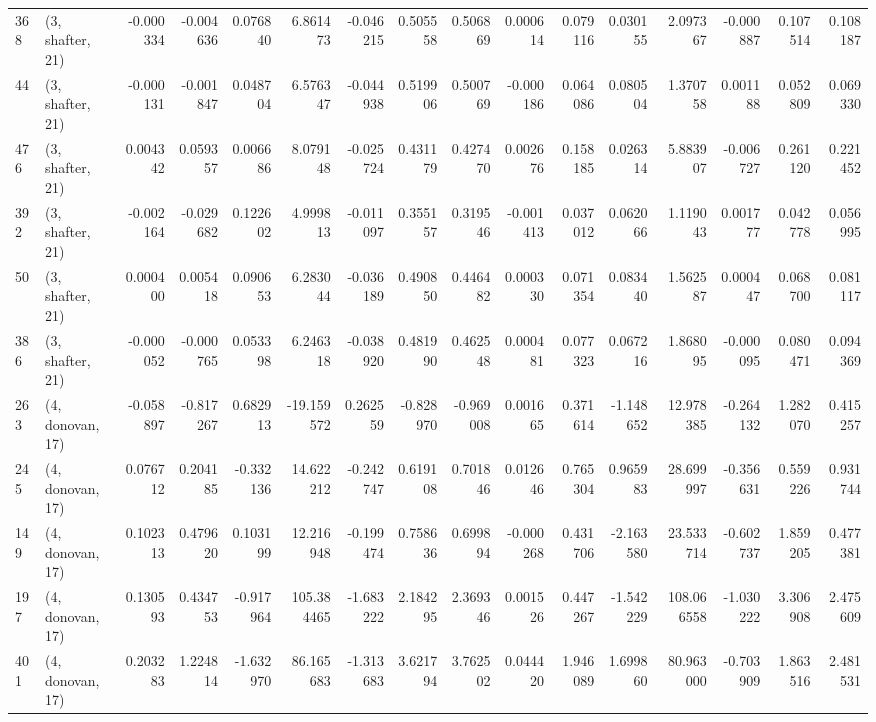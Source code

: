 \begin{tabular}{llrrrrrrrrrrrrrr}
368 &  (3, shafter, 21) &  -0.000334 & -0.004636 &  0.076840 &    6.861473 & -0.046215 &   0.505558 &  0.506869 &  0.000614 &  0.079116 &  0.030155 &    2.097367 & -0.000887 &  0.107514 &  0.108187 \\
44  &  (3, shafter, 21) &  -0.000131 & -0.001847 &  0.048704 &    6.576347 & -0.044938 &   0.519906 &  0.500769 & -0.000186 &  0.064086 &  0.080504 &    1.370758 &  0.001188 &  0.052809 &  0.069330 \\
476 &  (3, shafter, 21) &   0.004342 &  0.059357 &  0.006686 &    8.079148 & -0.025724 &   0.431179 &  0.427470 &  0.002676 &  0.158185 &  0.026314 &    5.883907 & -0.006727 &  0.261120 &  0.221452 \\
392 &  (3, shafter, 21) &  -0.002164 & -0.029682 &  0.122602 &    4.999813 & -0.011097 &   0.355157 &  0.319546 & -0.001413 &  0.037012 &  0.062066 &    1.119043 &  0.001777 &  0.042778 &  0.056995 \\
50  &  (3, shafter, 21) &   0.000400 &  0.005418 &  0.090653 &    6.283044 & -0.036189 &   0.490850 &  0.446482 &  0.000330 &  0.071354 &  0.083440 &    1.562587 &  0.000447 &  0.068700 &  0.081117 \\
386 &  (3, shafter, 21) &  -0.000052 & -0.000765 &  0.053398 &    6.246318 & -0.038920 &   0.481990 &  0.462548 &  0.000481 &  0.077323 &  0.067216 &    1.868095 & -0.000095 &  0.080471 &  0.094369 \\
263 &  (4, donovan, 17) &  -0.058897 & -0.817267 &  0.682913 &  -19.159572 &  0.262559 &  -0.828970 & -0.969008 &  0.001665 &  0.371614 & -1.148652 &   12.978385 & -0.264132 &  1.282070 &  0.415257 \\
245 &  (4, donovan, 17) &   0.076712 &  0.204185 & -0.332136 &   14.622212 & -0.242747 &   0.619108 &  0.701846 &  0.012646 &  0.765304 &  0.965983 &   28.699997 & -0.356631 &  0.559226 &  0.931744 \\
149 &  (4, donovan, 17) &   0.102313 &  0.479620 &  0.103199 &   12.216948 & -0.199474 &   0.758636 &  0.699894 & -0.000268 &  0.431706 & -2.163580 &   23.533714 & -0.602737 &  1.859205 &  0.477381 \\
197 &  (4, donovan, 17) &   0.130593 &  0.434753 & -0.917964 &  105.384465 & -1.683222 &   2.184295 &  2.369346 &  0.001526 &  0.447267 & -1.542229 &  108.066558 & -1.030222 &  3.306908 &  2.475609 \\
401 &  (4, donovan, 17) &   0.203283 &  1.224814 & -1.632970 &   86.165683 & -1.313683 &   3.621794 &  3.762502 &  0.044420 &  1.946089 &  1.699860 &   80.963000 & -0.703909 &  1.863516 &  2.481531 \\

\end{tabular}
